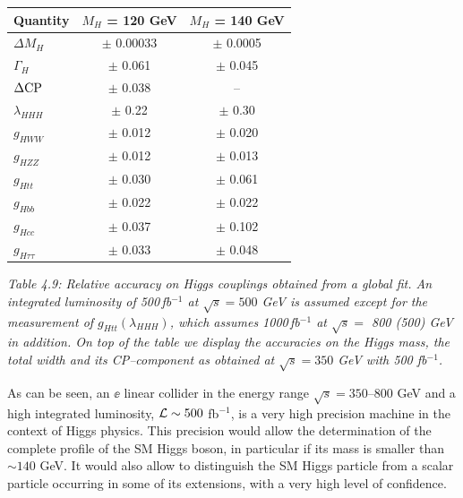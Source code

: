 \begin{table}[!h]
\vspace*{5mm}
\renewcommand{\arraystretch}{1.6}
\begin{center}
\begin{tabular}{|l|c|c|}
\hline
Quantity & $M_H$ = 120 GeV & $M_H$ = 140 GeV \\
\hline \hline
$\Delta M_H$ & $\pm$ 0.00033 & $\pm$ 0.0005 \\ 
$\Gamma_H$ & $\pm$ 0.061 & $\pm$ 0.045 \\ 
$\Delta {\rm CP}$ & $\pm$ 0.038 & -- \\ \hline
$\lambda_{HHH}$ & $\pm$ 0.22       &  $\pm$ 0.30 \\ 
$g_{HWW}$ & $\pm$ 0.012       &  $\pm$ 0.020           \\
$g_{HZZ}$ & $\pm$ 0.012       & $\pm$ 0.013            \\ 
$g_{Htt}$ & $\pm$ 0.030       & $\pm$ 0.061            \\
$g_{Hbb}$ & $\pm$ 0.022       & $\pm$ 0.022             \\
$g_{Hcc}$ & $\pm$ 0.037       & $\pm$ 0.102            \\ 
$g_{H\tau\tau}$ & $\pm$ 0.033       & $\pm$ 0.048            \\ \hline
\end{tabular}
\end{center}
\vspace*{2mm}
{\it  Table 4.9: Relative accuracy on Higgs couplings 
obtained from a global fit. An integrated luminosity of
500\,fb$^{-1}$ at $\sqrt{s} = 500$ GeV is assumed except for the measurement of
$g_{Htt} (\lambda_{HHH})$, which assumes 1000\,fb$^{-1}$ at $\sqrt{s} =$ 800 
(500) GeV in addition. On top of the table we display the accuracies on the
Higgs mass, the total width and its CP--component as obtained at $\sqrt{s}=350$
GeV with 500 fb$^{-1}$.}
\end{table}

As can be seen, an $\ee$ linear collider in the energy range $\sqrt{s}= 
350$--800 GeV and a high integrated luminosity, ${\cal L} \sim 500$ fb$^{-1}$,
is a very high precision machine in the context of Higgs physics.  This
precision would allow the determination of the complete profile of the SM Higgs
boson, in particular  if its mass is smaller than $\sim 140$ GeV. It would also
allow to distinguish the SM Higgs particle from a scalar particle occurring in
some of its extensions, with a very high level of confidence. \s

